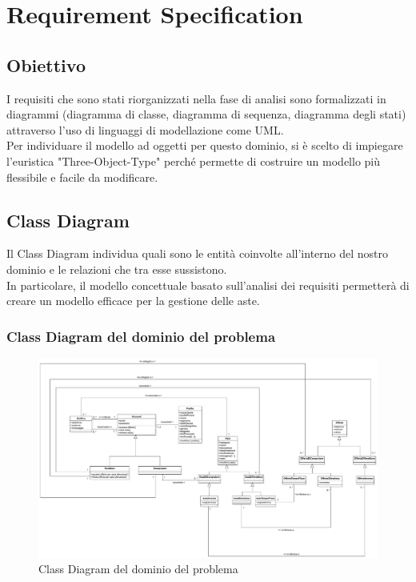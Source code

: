 
\chapter{Requirement Specification}
    \section{Obiettivo}
        I requisiti che sono stati riorganizzati nella fase di analisi sono formalizzati in diagrammi (diagramma di classe, diagramma di sequenza, diagramma degli stati) attraverso l'uso di linguaggi di modellazione come UML. \\
        Per individuare il modello ad oggetti per questo dominio, si è scelto di impiegare l'euristica "Three-Object-Type" perché permette di costruire un modello più flessibile e facile da modificare.

    \section{Class Diagram}
        Il Class Diagram individua quali sono le entità coinvolte all'interno del nostro dominio e le relazioni che tra esse sussistono.\\
        In particolare, il modello concettuale basato sull'analisi dei requisiti permetterà di creare un modello efficace per la gestione delle aste.\\
        
        \subsection{Class Diagram del dominio del problema}
            \begin{figure}[htbp!]
                \centering
                    \includegraphics[width=1\linewidth]{Immagini/Diagrammi/Class Diagram/Analisi/ClassDiagramDominio.pdf}
                \caption{Class Diagram del dominio del problema}
                \label{fig:Class Diagram del dominio del problema}
            \end{figure}


